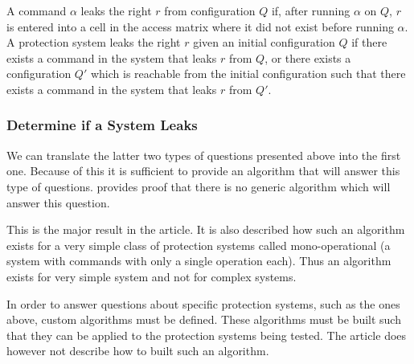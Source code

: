 \begin{definition}
A command $\alpha$ leaks the right $r$ from configuration $Q$ if, after running $\alpha$ on $Q$, $r$ is entered into a cell in the access matrix where it did not exist before running $\alpha$.
A protection system leaks the right $r$ given an initial configuration $Q$ if there exists a command in the system that leaks $r$ from $Q$, or there exists a configuration $Q'$ which is reachable from the initial configuration such that there exists a command in the system that leaks $r$ from $Q'$.
\end{definition}

\subsubsection{Determine if a System Leaks}
We can translate the latter two types of questions presented above into the first one.
Because of this it is sufficient to provide an algorithm that will answer this type of questions.
 provides proof that there is no generic algorithm which will answer this question.

This is the major result in the article.
It is also described how such an algorithm exists for a very simple class of protection systems called mono-operational (a system with commands with only a single operation each).
Thus an algorithm exists for very simple system and not for complex systems.

In order to answer questions about specific protection systems, such as the ones above, custom algorithms must be defined.
These algorithms must be built such that they can be applied to the protection systems being tested.
The article does however not describe how to built such an algorithm.
